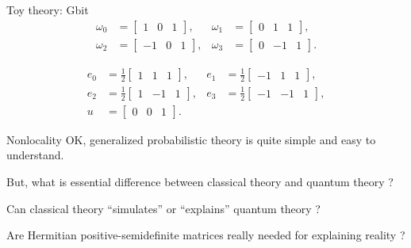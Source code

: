 \documentclass{beamer}
\theoremstyle{definition}
\begin{document}
\begin{frame}{Toy theory: Gbit}
\vspace{-1em}
\begin{align*}
\omega_0&=\begin{bmatrix} 1& 0& 1\end{bmatrix},&
\omega_1&=\begin{bmatrix} 0& 1& 1\end{bmatrix},\\
\omega_2&=\begin{bmatrix} -1& 0& 1\end{bmatrix},&
\omega_3&=\begin{bmatrix} 0& -1& 1\end{bmatrix}.
\end{align*}

\vspace{-1em}
\begin{align*}
e_0&=\frac12\begin{bmatrix} 1& 1& 1\end{bmatrix},&
e_1&=\frac12\begin{bmatrix} -1& 1& 1\end{bmatrix},\\
e_2&=\frac12\begin{bmatrix} 1& -1& 1\end{bmatrix},&
e_3&=\frac12\begin{bmatrix} -1& -1& 1\end{bmatrix},\\
u&=\begin{bmatrix} 0& 0& 1\end{bmatrix}.
\end{align*}
\end{frame}

\begin{frame}{Nonlocality}
\centering
OK, generalized probabilistic theory is quite simple and easy to understand.

\vspace{2em}
But, what is essential difference between classical theory and quantum theory ?

\vspace{2em}
Can classical theory ``simulates'' or ``explains'' quantum theory ?

\vspace{2em}
Are Hermitian positive-semidefinite matrices really needed for explaining reality ?
\end{frame}

\end{document}
